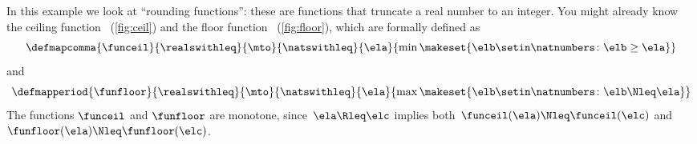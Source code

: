 \begin{example}
    \label{ex:rounding-functions}
    In this example we look at ``rounding functions'': these are functions that truncate a real number to an integer.
    You might already know the ceiling function \funceil~(\cref{fig:ceil}) and the floor function \funfloor~(\cref{fig:floor}),
    which are formally defined as
    \begin{equation}\label{eq:funceil}
        \defmapcomma{
            \funceil
        }{
            \realswithleq
        }{
            \mto
        }{
            \natswithleq
        }{
            \ela
        }{
            \min \makeset{\elb \setin \natnumbers \colon \elb \geq \ela }
        }
    \end{equation}
    and
    \begin{equation}\label{eq:funfloor}
        \defmapperiod{
            \funfloor
        }{
            \realswithleq
        }{
            \mto
        }{
            \natswithleq
        }{
            \ela
        }{
            \max \makeset{\elb \setin \natnumbers \colon \elb \Nleq \ela }
        }
    \end{equation}
    The functions $\funceil$ and $\funfloor$ are monotone, since~$\ela\Rleq \elc$ implies both~$\funceil(\ela)\Nleq \funceil(\elc)$ and~$\funfloor(\ela)\Nleq\funfloor(\elc)$.


\end{example}
